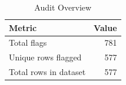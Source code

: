 \begin{table}[H]
\centering
\caption{\label{tab:audit-overview}Audit Overview}
\centering
\begin{tabular}[t]{lr}
\toprule
Metric & Value\\
\midrule
Total flags & 781\\
Unique rows flagged & 577\\
Total rows in dataset & 577\\
\bottomrule
\end{tabular}
\end{table}

